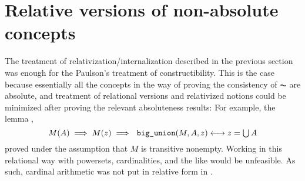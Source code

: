 \section{Relative versions of non-absolute concepts}
\label{sec:relat-vers-non-absol}

The treatment of relativization/internalization described in the
previous section was enough for the Paulson's treatment of
constructibility. This is the case because essentially all the
concepts in the way of proving the consistency of $\AC$ are
absolute, and treatment of relational versions and relativized notions
could be minimized after proving the relevant absoluteness results:
For example, the lemma ,
\[
  M(A) \implies M(z) \implies \isatt{big{\uscore}union}(M, A, z) \longleftrightarrow z = \union
  A
\]
proved under the assumption that $M$ is transitive nonempty. Working
in this relational 
way with powersets, cardinalities, and the like would be
unfeasible. As such, cardinal arithmetic was not put in relative form
in .

